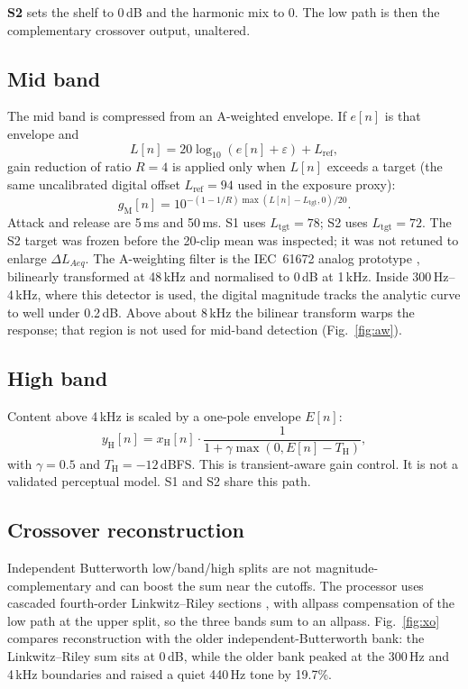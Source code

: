 \documentclass[12pt,journal,onecolumn]{IEEEtran}
\begin{document}
\textbf{S2} sets the shelf to $0$\,dB and the harmonic mix to $0$. The low path is then the complementary crossover output, unaltered.

\subsection{Mid band}

The mid band is compressed from an A-weighted envelope. If $e[n]$ is that envelope and
\begin{equation}
L[n] = 20\log_{10}(e[n]+\varepsilon) + L_{\mathrm{ref}},
\end{equation}
gain reduction of ratio $R=4$ is applied only when $L[n]$ exceeds a target (the same uncalibrated digital offset $L_{\mathrm{ref}}=94$ used in the exposure proxy):
\begin{equation}
g_{\mathrm{M}}[n] = 10^{-(1-1/R)\max(L[n]-L_{\mathrm{tgt}},0)/20}.
\end{equation}
Attack and release are 5\,ms and 50\,ms. S1 uses $L_{\mathrm{tgt}}=78$; S2 uses $L_{\mathrm{tgt}}=72$. The S2 target was frozen before the 20-clip mean was inspected; it was not retuned to enlarge $\Delta L_{Aeq}$. The A-weighting filter is the IEC~61672 analog prototype \cite{IEC61672}, bilinearly transformed at 48\,kHz and normalised to 0\,dB at 1\,kHz. Inside 300\,Hz--4\,kHz, where this detector is used, the digital magnitude tracks the analytic curve to well under 0.2\,dB. Above about 8\,kHz the bilinear transform warps the response; that region is not used for mid-band detection (Fig.~\ref{fig:aw}).

\subsection{High band}

Content above 4\,kHz is scaled by a one-pole envelope $E[n]$:
\begin{equation}
y_{\mathrm{H}}[n] = x_{\mathrm{H}}[n]\cdot \frac{1}{1+\gamma \max(0, E[n]-T_{\mathrm{H}})},
\end{equation}
with $\gamma=0.5$ and $T_{\mathrm{H}}=-12$\,dBFS. This is transient-aware gain control. It is not a validated perceptual model. S1 and S2 share this path.

\subsection{Crossover reconstruction}

Independent Butterworth low/band/high splits are not magnitude-complementary and can boost the sum near the cutoffs. The processor uses cascaded fourth-order Linkwitz--Riley sections \cite{Linkwitz1976}, with allpass compensation of the low path at the upper split, so the three bands sum to an allpass. Fig.~\ref{fig:xo} compares reconstruction with the older independent-Butterworth bank: the Linkwitz--Riley sum sits at 0\,dB, while the older bank peaked at the 300\,Hz and 4\,kHz boundaries and raised a quiet 440\,Hz tone by 19.7\%.
\end{document}
